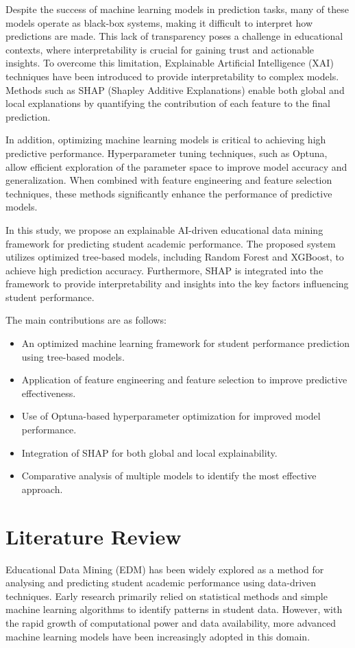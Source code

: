 \documentclass[conference]{IEEEtran}
\begin{document}
Despite the success of machine learning models in prediction tasks, many of these models operate as black-box systems, making it difficult to interpret how predictions are made. This lack of transparency poses a challenge in educational contexts, where interpretability is crucial for gaining trust and actionable insights. To overcome this limitation, Explainable Artificial Intelligence (XAI) techniques have been introduced to provide interpretability to complex models. Methods such as SHAP (Shapley Additive Explanations) enable both global and local explanations by quantifying the contribution of each feature to the final prediction. 

In addition, optimizing machine learning models is critical to achieving high predictive performance. Hyperparameter tuning techniques, such as Optuna, allow efficient exploration of the parameter space to improve model accuracy and generalization. When combined with feature engineering and feature selection techniques, these methods significantly enhance the performance of predictive models. 

In this study, we propose an explainable AI-driven educational data mining framework for predicting student academic performance. The proposed system utilizes optimized tree-based models, including Random Forest and XGBoost, to achieve high prediction accuracy. Furthermore, SHAP is integrated into the framework to provide interpretability and insights into the key factors influencing student performance. 

The main contributions are as follows:
\begin{itemize}[leftmargin=1.5em]
	\item An optimized machine learning framework for student performance prediction using tree-based models.
	\item Application of feature engineering and feature selection to improve predictive effectiveness.
	\item Use of Optuna-based hyperparameter optimization for improved model performance.
	\item Integration of SHAP for both global and local explainability.
	\item Comparative analysis of multiple models to identify the most effective approach.
\end{itemize}

\section{Literature Review}
Educational Data Mining (EDM) has been widely explored as a method for analysing and predicting student academic performance using data-driven techniques. Early research primarily relied on statistical methods and simple machine learning algorithms to identify patterns in student data. However, with the rapid growth of computational power and data availability, more advanced machine learning models have been increasingly adopted in this domain. 
\end{document}
